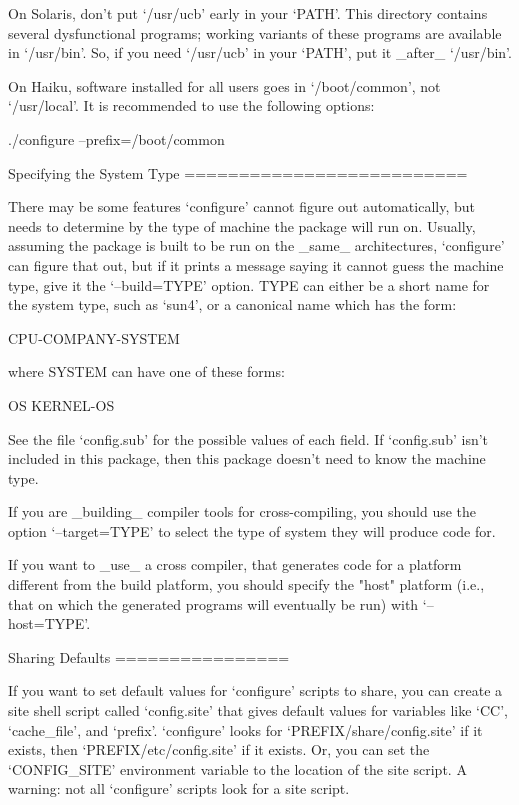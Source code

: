 \begin{DoxyVerbInclude}
   On Solaris, don't put `/usr/ucb' early in your `PATH'.  This
directory contains several dysfunctional programs; working variants of
these programs are available in `/usr/bin'.  So, if you need `/usr/ucb'
in your `PATH', put it _after_ `/usr/bin'.

   On Haiku, software installed for all users goes in `/boot/common',
not `/usr/local'.  It is recommended to use the following options:

     ./configure --prefix=/boot/common

Specifying the System Type
==========================

   There may be some features `configure' cannot figure out
automatically, but needs to determine by the type of machine the package
will run on.  Usually, assuming the package is built to be run on the
_same_ architectures, `configure' can figure that out, but if it prints
a message saying it cannot guess the machine type, give it the
`--build=TYPE' option.  TYPE can either be a short name for the system
type, such as `sun4', or a canonical name which has the form:

     CPU-COMPANY-SYSTEM

where SYSTEM can have one of these forms:

     OS
     KERNEL-OS

   See the file `config.sub' for the possible values of each field.  If
`config.sub' isn't included in this package, then this package doesn't
need to know the machine type.

   If you are _building_ compiler tools for cross-compiling, you should
use the option `--target=TYPE' to select the type of system they will
produce code for.

   If you want to _use_ a cross compiler, that generates code for a
platform different from the build platform, you should specify the
"host" platform (i.e., that on which the generated programs will
eventually be run) with `--host=TYPE'.

Sharing Defaults
================

   If you want to set default values for `configure' scripts to share,
you can create a site shell script called `config.site' that gives
default values for variables like `CC', `cache_file', and `prefix'.
`configure' looks for `PREFIX/share/config.site' if it exists, then
`PREFIX/etc/config.site' if it exists.  Or, you can set the
`CONFIG_SITE' environment variable to the location of the site script.
A warning: not all `configure' scripts look for a site script.


\end{DoxyVerbInclude}
